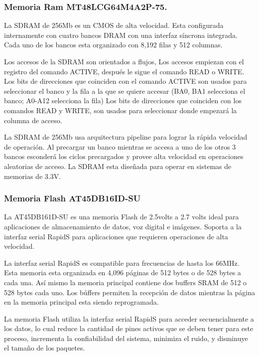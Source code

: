 \subsubsection*{Memoria Ram MT48LCG64M4A2P-75. }

La SDRAM de 256Mb es un CMOS de alta velocidad. Esta configurada internamente
con cuatro bancos DRAM con una interfaz síncrona integrada. Cada uno
de los bancos esta organizado con 8,192 filas y 512 columnas. \citet{mt48}

Los accesos de la SDRAM son orientados a flujos, Los accesos empiezan
con el registro del comando ACTIVE, despu\'{e}s le sigue el comando
READ o WRITE. Los bits de direcciones que coinciden con el comando
ACTIVE son usados para seleccionar el banco y la fila a la que se
quiere accesar (BA0, BA1 selecciona el banco; A0-A12 selecciona la
fila) Los bits de direcciones que coinciden con los comandos READ
y WRITE, son usados para seleccionar donde empezar\'{a} la columna
de acceso. 

La SDRAM de 256Mb usa arquitectura pipeline para lograr la r\'{a}pida
velocidad de operaci\'{o}n. Al precargar un banco mientras se accesa
a uno de los otros 3 bancos esconder\'{a} los ciclos precargados y
provee alta velocidad en operaciones aleatorias de acceso. La SDRAM
esta diseñada para operar en sistemas de memorias de 3.3V. 


\subsubsection*{Memoria Flash AT45DB16ID-SU }

La AT45DB161D-SU es una memoria Flash de 2.5volts a 2.7 volts ideal
para aplicaciones de almacenamiento de datos, voz digital e imágenes.
Soporta a la interfaz serial RapidS para aplicaciones que requieren
operaciones de alta velocidad. 

La interfaz serial RapidS es compatible para frecuencias de hasta
los 66MHz. Esta memoria esta organizada en 4,096 p\'{a}ginas de 512
bytes o de 528 bytes a cada una. As\'{i} mismo la memoria principal
contiene dos buffers SRAM de 512 o 528 bytes cada uno. Los búffers
permiten la recepci\'{o}n de datos mientras la p\'{a}gina en la memoria
principal esta siendo reprogramada. 

La memoria Flash utiliza la interfaz serial RapidS para acceder secuencialmente
a los datos, lo cual reduce la cantidad de pines activos que se deben
tener para este proceso, incrementa la confiabilidad del sistema,
minimiza el ruido, y disminuye el tamaño de los paquetes. 

